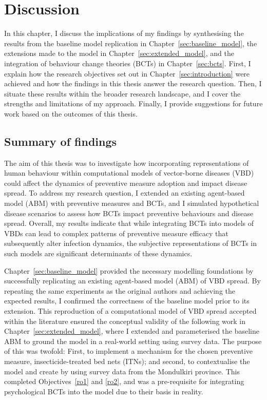 \section{Discussion}\label{sec:discussion}

In this chapter, I discuss the implications of my findings by synthesising the results from the baseline model replication in Chapter~\ref{sec:baseline_model}, the extensions made to the model in Chapter~\ref{sec:extended_model}, and the integration of behaviour change theories (BCTs) in Chapter~\ref{sec:bcts}. First, I explain how the research objectives set out in Chapter~\ref{sec:introduction} were achieved and how the findings in this thesis answer the research question. Then, I situate these results within the broader research landscape, and I cover the strengths and limitations of my approach. Finally, I provide suggestions for future work based on the outcomes of this thesis.

\subsection{Summary of findings}

The aim of this thesis was to investigate how incorporating representations of human behaviour within computational models of vector-borne diseases (VBD) could affect the dynamics of preventive measure adoption and impact disease spread. To address my research question, I extended an existing agent-based model (ABM) with preventive measures and BCTs, and I simulated hypothetical disease scenarios to assess how BCTs impact preventive behaviours and disease spread. Overall, my results indicate that while integrating BCTs into models of VBDs can lead to complex patterns of preventive measure efficacy that subsequently alter infection dynamics, the subjective representations of BCTs in such models are significant determinants of these dynamics.

Chapter~\ref{sec:baseline_model} provided the necessary modelling foundations by successfully replicating an existing agent-based model (ABM) of VBD spread. By repeating the same experiments as the original authors and achieving the expected results, I confirmed the correctness of the baseline model prior to its extension. This reproduction of a computational model of VBD spread accepted within the literature ensured the conceptual validity of the following work in Chapter~\ref{sec:extended_model}, where I extended and parameterised the baseline ABM to ground the model in a real-world setting using survey data. The purpose of this was twofold: First, to implement a mechanism for the chosen preventive measure, insecticide-treated bed nets (ITNs); and second, to contextualise the model and create  by using survey data from the Mondulkiri province. This completed Objectives~\ref{ro1} and \ref{ro2}, and was a pre-requisite for integrating psychological BCTs into the model due to their basis in reality.

